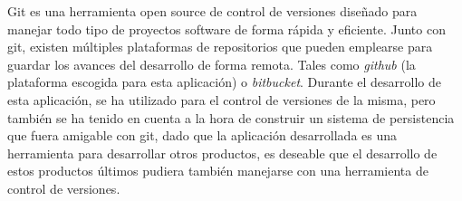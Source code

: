 Git es una herramienta open source de control de versiones diseñado para manejar todo tipo de proyectos software de forma rápida y eficiente.
Junto con git, existen múltiples plataformas de repositorios que pueden emplearse para guardar los avances del desarrollo de forma remota. Tales como \textit{github} (la plataforma escogida para esta aplicación) o \textit{bitbucket}.
Durante el desarrollo de esta aplicación, se ha utilizado para el control de versiones de la misma, pero también se ha tenido en cuenta a la hora de construir un sistema de persistencia que fuera amigable con git, dado que la aplicación desarrollada es una herramienta para desarrollar otros productos, es deseable que el desarrollo de estos productos últimos pudiera también manejarse con una herramienta de control de versiones.
